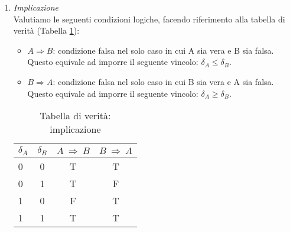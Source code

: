 \begin{enumerate}
\item \textit{Implicazione}\\
Valutiamo le seguenti condizioni logiche, facendo riferimento alla tabella di verità (Tabella \ref{tab:tableImp1}): 
\begin{itemize}
\item $A\Longrightarrow B$: condizione falsa nel solo caso in cui A sia vera e B sia falsa.
Questo equivale ad imporre il seguente vincolo: $\delta_A \leq \delta_B$.

\item $B \Longrightarrow A$: condizione falsa nel solo caso in cui B sia vera e A sia falsa.
Questo equivale ad imporre il seguente vincolo: $\delta_A \geq \delta_B$.
\end{itemize}

\begin{table}[h!]
  \begin{center}
    \begin{tabular}{l|c|c|c} %
      $\delta_A$ & $\delta_B$ & $A~\Longrightarrow~B$ & $B~\Longrightarrow~A$ \\
      \hline
      0 & 0 & T & T\\
      0 & 1 & T & F\\
      1 & 0 & F & T\\
      1 & 1 & T & T\\
    \end{tabular}
    \caption{Tabella di verità: implicazione}
    \label{tab:tableImp1}
  \end{center}
\end{table}



\end{enumerate}
